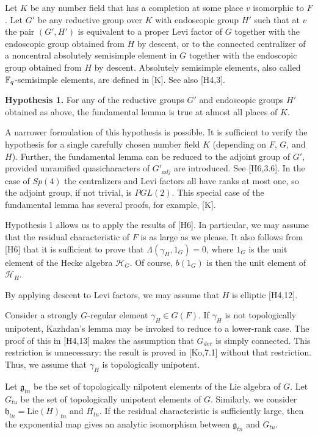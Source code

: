 \documentclass{amsart}
\newcommand\g{{\mathfrak g}}
\newcommand\h{{\mathfrak h}}
\newcommand\cH{{\mathcal H}}
\begin{document}
Let $K$ be any number field that has a completion at some
place $v$ isomorphic to $F$.  Let $G'$ be any reductive
group over $K$ with endoscopic group $H'$ such that at
$v$ the pair $(G',H')$ is equivalent to a proper Levi factor of
$G$ together with the endoscopic group obtained from $H$
by descent, or to the connected centralizer of a noncentral
absolutely semisimple element in $G$ together with the
endoscopic group obtained from $H$ by descent.  
Absolutely semisimple elements, also called ${\Bbb F_q}$-semisimple
elements, are defined in [K].
See also [H4,3].

{\bf Hypothesis 1.}  For any of the reductive groups $G'$
and endoscopic groups $H'$ obtained as above,
the fundamental lemma is true at almost all places of $K$.

A narrower formulation of this hypothesis is possible.  It
is sufficient to verify the hypothesis for a single
carefully chosen number field $K$ (depending on $F$, $G$, and $H$).
Further, 
the fundamental lemma can be reduced to the adjoint
group of $G'$, provided unramified quasicharacters
of $G'_{adj}$ are introduced.  See [H6,3.6].
In the case of $Sp(4)$ the centralizers and Levi factors all have
ranks at most one, so the adjoint group, if not trivial, is $PGL(2)$.
This special case of the
fundamental lemma has several proofs,  for example, [K].

Hypothesis 1 allows us
to apply the results of [H6].  
In particular,
we may assume that the residual characteristic of $F$ is as large
as we please.  It also follows from [H6] that it is sufficient to
prove that $\Lambda(\gamma_H,1_G)=0$, where $1_G$ is the unit element
of the Hecke algebra $\cH_G$.  Of course, $b(1_G)$ is then
the  unit element
of $\cH_H$.  

By applying descent to Levi factors, we may assume that
$H$ is elliptic [H4,12].

Consider a strongly $G$-regular element $\gamma_H \in G(F)$.  If
$\gamma_H$ is not topologically unipotent, Kazhdan's lemma may be
invoked to reduce to a lower-rank case.  
The proof of this in [H4,13] makes the assumption that $G_{der}$ is
simply connected.  This restriction is unnecessary:
the result is proved in [Ko,7.1] without that restriction. 
Thus, we assume
that $\gamma_H$ is topologically unipotent.

Let $\g_{tn}$ be the set of topologically nilpotent elements of the
Lie algebra of $G$.  Let $G_{tu}$ be the set of topologically unipotent
elements of $G$.  Similarly, we consider $\h_{tn} = \text{Lie}(H)_{tn}$ and $H_{tu}$.
If the residual characteristic is sufficiently large,
then the exponential map gives an analytic isomorphism between
$\g_{tn}$ and $G_{tu}$.
\end{document}
